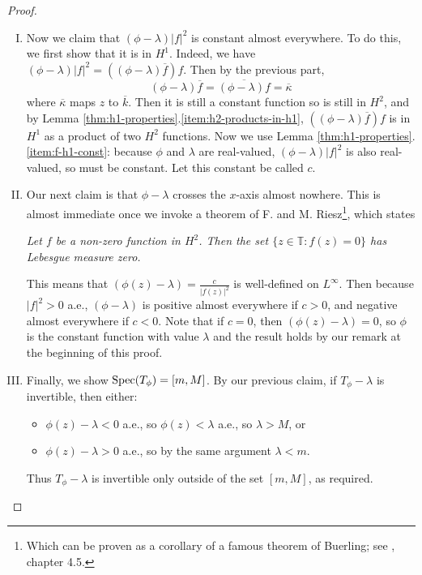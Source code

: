 \documentclass[../main.tex]{subfiles}
\begin{document}
\begin{proof}
\begin{enumerate}[I.]
\item Now we claim that $(\phi - \lambda)|f|^2$ is constant almost everywhere.
To do this, we first show that it is in $H^1$. Indeed, we have
$(\phi - \lambda)|f|^2 = ((\phi - \lambda)\overline{f}) f$.
Then by the previous part, 
$$(\phi - \lambda)\overline{f} = \overline{(\phi - \lambda)f} = \overline{\kappa}$$
where $\overline{\kappa}$ maps $z$ to $\overline{k}$. Then it is still a
constant function so is still in $H^2$, and by Lemma
\ref{thm:h1-properties}.\ref{item:h2-products-in-h1},
$((\phi - \lambda)\overline{f}) f$ is in $H^1$ as a product of two $H^2$ functions.
Now we use Lemma \ref{thm:h1-properties}.\ref{item:f-h1-const}: because $\phi$ and
$\lambda$ are real-valued, $(\phi - \lambda)|f|^2$ is also real-valued, so must
be constant. Let this constant be called $c$.
\item Our next claim is that $\phi - \lambda$ crosses the $x$-axis almost nowhere.
This is almost immediate once we invoke a theorem of F. and M. Riesz\footnote{Which can
be proven as a corollary of a famous theorem of Buerling; see
\parencite{arveson2002short}, chapter 4.5.}, which states
\begin{displayquote}
\emph{Let $f$ be a non-zero function in $H^2$. Then the set $\{z \in \mathbb{T}
: f(z) = 0\}$ has Lebesgue measure zero.}
\end{displayquote}
This means that $(\phi(z) - \lambda) = \frac{c}{|f(z)|^2}$ is well-defined on
$L^\infty$. Then because $|f|^2 > 0$ a.e., $(\phi - \lambda)$ is
positive almost everywhere if $c > 0$, and negative almost
everywhere if $c < 0$. Note that if $c = 0$, then $(\phi(z) -
\lambda) = 0$, so $\phi$ is the constant function with value
$\lambda$ and the result holds by our remark at the beginning of
this proof.
\item Finally, we show $\mathrm{Spec}(T_\phi) = [m, M]$. By our previous claim, if
$T_\phi - \lambda$ is invertible, then either:
\begin{itemize}
\item $\phi(z) - \lambda < 0$ a.e., so $\phi(z) < \lambda$ a.e., so $\lambda > M$, or
\item $\phi(z) - \lambda > 0$ a.e., so by the same argument $\lambda < m$.
\end{itemize}
Thus $T_\phi - \lambda$ is invertible only outside of the set $[m, M]$, as required.
\end{enumerate}
\end{proof}
\end{document}

